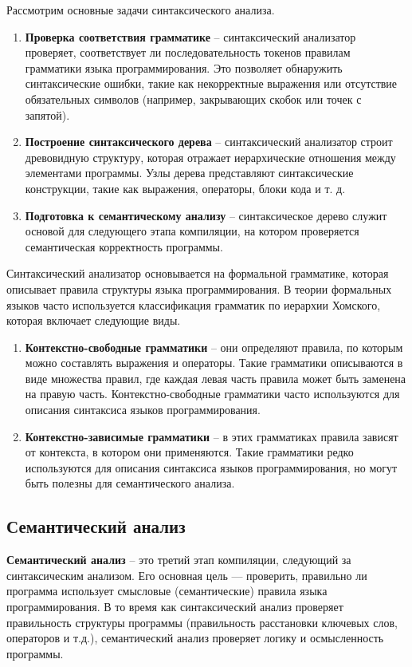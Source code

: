 Рассмотрим основные задачи синтаксического анализа.
\begin{enumerate}
  \item \textbf{Проверка соответствия грамматике} -- синтаксический анализатор проверяет, соответствует ли последовательность токенов правилам грамматики языка программирования. Это позволяет обнаружить синтаксические ошибки, такие как некорректные выражения или отсутствие обязательных символов (например, закрывающих скобок или точек с запятой).
  \item \textbf{Построение синтаксического дерева} -- синтаксический анализатор строит древовидную структуру, которая отражает иерархические отношения между элементами программы. Узлы дерева представляют синтаксические конструкции, такие как выражения, операторы, блоки кода и т. д.
  \item \textbf{Подготовка к семантическому анализу} -- синтаксическое дерево служит основой для следующего этапа компиляции, на котором проверяется семантическая корректность программы.
\end{enumerate}


Синтаксический анализатор основывается на формальной грамматике, которая описывает правила структуры языка программирования. В теории формальных языков часто используется классификация грамматик по иерархии Хомского, которая включает следующие виды.

\begin{enumerate}
  \item \textbf{Контекстно-свободные грамматики} -- они определяют правила, по которым можно составлять выражения и операторы. Такие грамматики описываются в виде множества правил, где каждая левая часть правила может быть заменена на правую часть. Контекстно-свободные грамматики часто используются для описания синтаксиса языков программирования.
  \item \textbf{Контекстно-зависимые грамматики} -- в этих грамматиках правила зависят от контекста, в котором они применяются. Такие грамматики редко используются для описания синтаксиса языков программирования, но могут быть полезны для семантического анализа.
\end{enumerate}


\subsection{Семантический анализ}

\textbf{Семантический анализ} \cite{semantic-analyzer} -- это третий этап компиляции, следующий за синтаксическим анализом. Его основная цель — проверить, правильно ли программа использует смысловые (семантические) правила языка программирования. В то время как синтаксический анализ проверяет правильность структуры программы (правильность расстановки ключевых слов, операторов и т.д.), семантический анализ проверяет логику и осмысленность программы.


